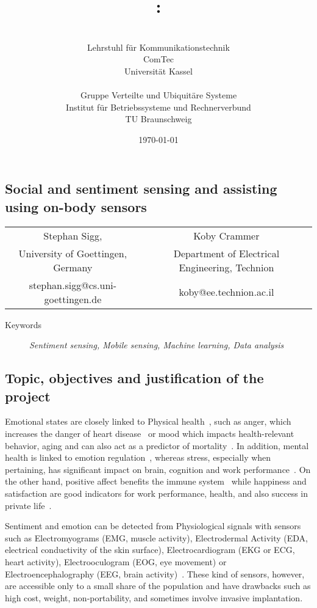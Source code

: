 \documentclass[12pt]{article}
\author{\begin{minipage}[t]{7.1cm}\centering \small \VornameAntragstellerA\ \NachnameAntragstellerA\\ \small Lehrstuhl für Kommunikationstechnik\\ \small ComTec\\ \small Universität Kassel\end{minipage}
\begin{minipage}[t]{7.1cm}\centering \small \VornameAntragstellerB\ \NachnameAntragstellerB\\ \small Gruppe Verteilte und Ubiquitäre Systeme \\ \small Institut für Betriebssysteme und Rechnerverbund\\ \small TU Braunschweig\end{minipage}}
\title{\projektname:\\\notiz{Social and sentiment sensing and assisting using on-body sensors}}
\date{\small \today}
\begin{document}
\onehalfspacing %
\setcounter{secnumdepth}{5}
\pagebreak
\begin{center}
\section*{Social and sentiment sensing and assisting using on-body sensors}
\begin{tabular}{cc}
  Stephan Sigg, & Koby Crammer\\
  University of Goettingen, Germany & Department of Electrical Engineering, Technion \\
 stephan.sigg@cs.uni-goettingen.de & koby@ee.technion.ac.il
\end{tabular}

\end{center}
\begin{description}
	\item[Keywords] \textit{Sentiment sensing, Mobile sensing, Machine learning, Data analysis}
\end{description}

\subsection*{Topic, objectives and justification of the project}
Emotional states are closely linked to Physical health~\cite{SentimentSensing_Salovey_2000}, such as anger, which increases the danger of heart disease~\cite{SentimentSensing_Smith_2004} or mood which impacts health-relevant behavior, aging and can also act as a predictor of mortality~\cite{SentimentSensing_Todaro_2003}.
In addition, mental health is linked to emotion regulation~\cite{SentimentSensing_Gross_1995}, whereas stress, especially when pertaining, has significant impact on brain, cognition and work performance~\cite{SentimentSensing_Lupien_2009}.
On the other hand, positive affect benefits the immune system~\cite{SentimentSensing_Smith_2004} while happiness and satisfaction are good indicators for work performance, health, and also success in private life~\cite{SentimentSensing_Lyubomirsky_2005}.

Sentiment and emotion can be detected from Physiological signals with sensors such as Electromyograms (EMG, muscle activity), Electrodermal Activity (EDA, electrical conductivity of the skin surface), Electrocardiogram (EKG or ECG, heart activity), Electrooculogram (EOG, eye movement) or Electroencephalography (EEG, brain activity)~\cite{SentimentSensing_Calvo_2010}.
These kind of sensors, however, are accessible only to a small share of the population and have drawbacks such as high cost, weight, non-portability, and sometimes involve invasive implantation.
\end{document}
